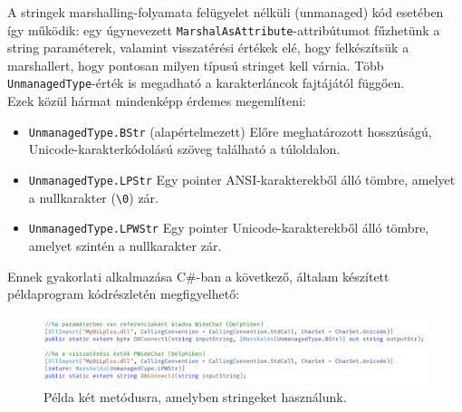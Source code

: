 \documentclass[tocnopagenum]{thesis-ekf}
\theoremstyle{definition}
\theoremstyle{remark}
\begin{document}
	A stringek marshalling-folyamata felügyelet nélküli (unmanaged) kód esetében így működik: egy úgynevezett \verb*|MarshalAsAttribute|-attribútumot fűzhetünk a string paraméterek, valamint visszatérési értékek elé, hogy felkészítsük a marshallert, hogy pontosan milyen típusú stringet kell várnia. Több \verb*|UnmanagedType|-érték is megadható a karakterláncok fajtájától függően.\cite{marshalling_strings}\\
	Ezek közül hármat mindenképp érdemes megemlíteni:
	\begin{itemize}
		\item \verb*|UnmanagedType.BStr| (alapértelmezett) Előre meghatározott hosszúságú, Unicode-karakterkódolású szöveg található a túloldalon.
		\item \verb*|UnmanagedType.LPStr| Egy pointer ANSI-karakterekből álló tömbre, amelyet a nullkarakter (\verb*|\0|) zár.
		\item \verb*|UnmanagedType.LPWStr| Egy pointer Unicode-karakterekből álló tömbre, amelyet szintén a nullkarakter zár.
	\end{itemize}
	Ennek gyakorlati alkalmazása C\#-ban a következő, általam készített példaprogram kódrészletén megfigyelhető:
	\begin{figure}[h!]
		\centering
		\hspace*{-0.6in}
		\includegraphics[scale=0.75]{marshalas}
		\caption{Példa két metódusra, amelyben stringeket használunk.}
		\label{fig:marshalas}
	\end{figure}
\end{document}
